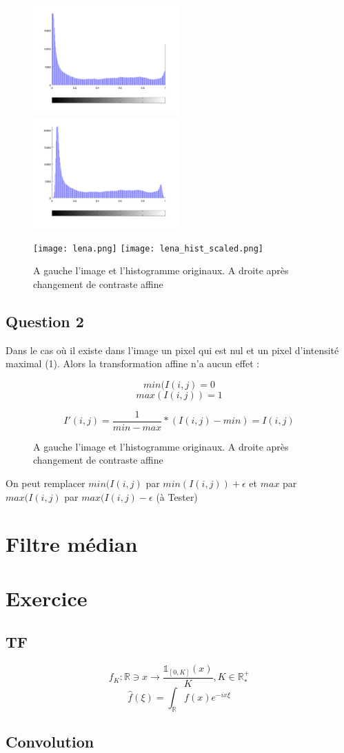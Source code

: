 \documentclass{article}
\begin{document}
\begin{figure}[h]

	\includegraphics[width=0.5\textwidth]{hist_orig.png}
	\includegraphics[width=0.5\textwidth]{hist_scaled.png}
		
	\texttt{[image: lena.png]}
	\texttt{[image: lena\_hist\_scaled.png]}
		
	\caption{A gauche l'image et l'histogramme originaux. A droite après changement de contraste affine}
	
\end{figure}

\subsection*{Question 2}

Dans le cas où il existe dans l'image un pixel qui est nul et un pixel d'intensité maximal (1). Alors la transformation affine n'a aucun effet : 


$$min(I(i,j) = 0$$
$$max(I(i,j)) = 1$$
	
$$I'(i,j) = \frac{1}{min-max} * (I(i,j) - min) = I(i,j)$$


\begin{figure}[h]
		
	\caption{A gauche l'image et l'histogramme originaux. A droite après changement de contraste affine}
	
\end{figure}


On peut remplacer $min(I(i,j)$ par $min(I(i,j)) + \epsilon$ et $max$ par $max(I(i,j)$ par $max(I(i,j) - \epsilon$ (à Tester)


\section{Filtre médian}

\section{Exercice}
\subsection{TF}
$$ f_K : \mathbb{R} \ni x \rightarrow \frac{\mathds{1}_{[0, K]}(x)}{K}, K \in \mathbb{R}_*^+ $$
$$ \hat{f}(\xi) = \int_\mathbb{R} f(x) e^{-ix\xi}$$
\subsection{Convolution}
\end{document}
